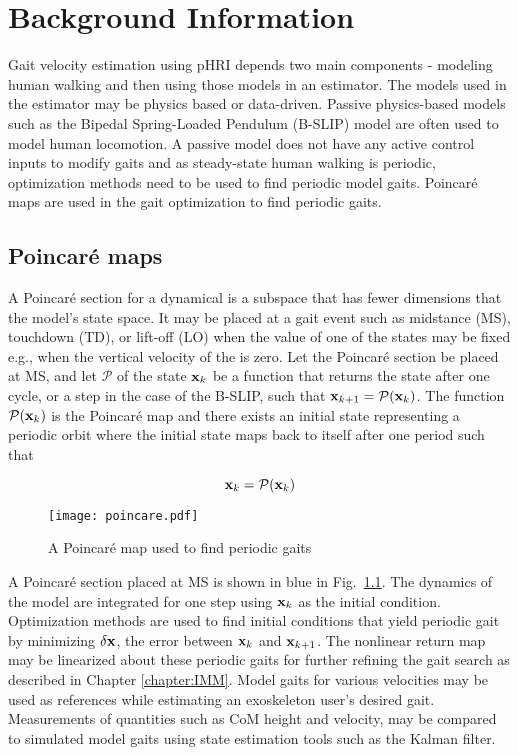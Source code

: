 \chapter{Background Information}

Gait velocity estimation using pHRI depends two main components - modeling human walking and then using those models in an estimator. The models used in the estimator may be physics based or data-driven. Passive physics-based models such as the Bipedal Spring-Loaded Pendulum (B-SLIP) \cite{geyer2006compliant,liu2015dynamic} model are often used to model human locomotion. A passive model does not have any active control inputs to modify gaits and as steady-state human walking is periodic, optimization methods need to be used to find periodic model gaits. Poincar\'e maps are used in the gait optimization \cite{strogatz2018nonlinear,garcia1998simplest} to find periodic gaits.

\section{Poincar\'e maps}

A Poincar\'e section for a dynamical is a subspace that has fewer dimensions that the model's state space. It may be placed at a gait event such as midstance (MS), touchdown (TD), or lift-off (LO) when the value of one of the states may be fixed e.g., when the vertical velocity of the \COM is zero. Let the Poincar\'e section be placed at MS, and let $ \mathcal{P} $ of the state $ \mathbf{x}_k $ be a function that returns the state after one cycle, or a step in the case of the B-SLIP, such that $ \mathbf{x}_{k+1} = \mathcal{P}(\mathbf{x}_k) $. The function $ \mathcal{P}(\mathbf{x}_k) $ is the Poincar\'e map and there exists an initial state representing a periodic orbit where the initial state maps back to itself after one period such that

\begin{equation}
	\mathbf{x}_k = \mathcal{P}(\mathbf{x}_k)
\end{equation}

\begin{figure}
	\centering
	\texttt{[image: poincare.pdf]}
	\caption{A Poincar\'e map used to find periodic gaits}\label{fig:poincare}
\end{figure}

A Poincar\'e section placed at MS is shown in blue in Fig.~\ref{fig:poincare}. The dynamics of the model are integrated for one step using $ \mathbf{x}_k $ as the initial condition. Optimization methods are used to find initial conditions that yield periodic gait by minimizing $ \delta \mathbf{x} $, the error between $ \mathbf{x}_k $ and $ \mathbf{x}_{k+1} $. The nonlinear return map may be linearized about these periodic gaits for further refining the gait search as described in Chapter \ref{chapter:IMM}. Model gaits for various velocities may be used as references while estimating an exoskeleton user's desired gait. Measurements of quantities such as CoM height and velocity, may be compared to simulated model gaits using state estimation tools such as the Kalman filter.

